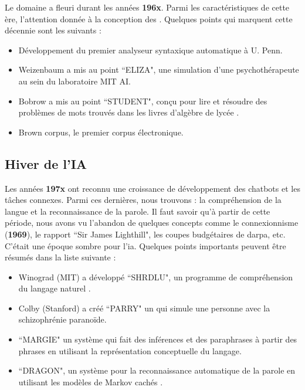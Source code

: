 \documentclass{KodeBook}
\begin{document}
Le domaine a fleuri durant les années \textbf{196x}.
Parmi les caractéristiques de cette ère, l'attention donnée à la conception des . 
Quelques points qui marquent cette décennie sont les suivants :
\begin{itemize}
	\item {} Développement du premier analyseur syntaxique automatique à U. Penn. \cite{1961-joshi,1962-harris} 
	\item {} Weizenbaum a mis au point ``ELIZA", une simulation d'une psychothérapeute au sein du laboratoire MIT AI.
	\item {} Bobrow a mis au point ``STUDENT", conçu pour lire et résoudre des problèmes de mots trouvés dans les livres d'algèbre de lycée \cite{1964-bobrow}.
	\item {} Brown corpus, le premier corpus électronique.
\end{itemize}

\subsection{Hiver de l'IA}

Les années \textbf{197x} ont reconnu une croissance de développement des chatbots et les tâches connexes. 
Parmi ces dernières, nous trouvons : la compréhension de la langue et la reconnaissance  de la parole. 
Il faut savoir qu'à partir de cette période, nous avons vu l'abandon de quelques concepts comme le connexionnisme (\textbf{1969}), le rapport ``Sir James Lighthill", les coupes budgétaires de \ac{darpa}, etc. 
C'était une époque sombre pour l'\ac{ia}.
Quelques points importants peuvent être résumés dans la liste suivante :
\begin{itemize}
	\item {} Winograd (MIT) a développé ``SHRDLU", un programme de compréhension du langage naturel \cite{1971-winograd}.
	\item {} Colby (Stanford) a créé ``PARRY" un  qui simule une personne avec la schizophrénie paranoïde.
	\item {} ``MARGIE" un système qui fait des inférences et des paraphrases à partir des phrases en utilisant la représentation conceptuelle du langage. 
	\item {} ``DRAGON", un système pour la reconnaissance automatique de la parole en utilisant les modèles de Markov cachés \cite{1975-baker}.
\end{itemize}
\end{document}
